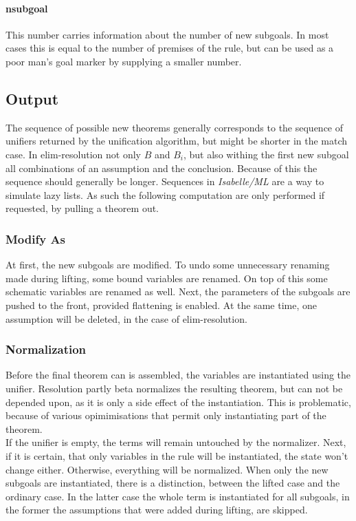 \paragraph{nsubgoal}
This number carries information about the number of new subgoals. In most cases this is equal to the number of premises of the rule, but can be used as a poor man's goal marker by supplying a smaller number.


\subsection{Output}
The sequence of possible new theorems generally corresponds to the sequence of unifiers returned by the unification algorithm, but might be shorter in the match case. In elim-resolution not only $B$ and $B_i$, but also withing the first new subgoal all combinations of an assumption and the conclusion. Because of this the sequence should generally be longer. Sequences in \textit{Isabelle/ML} are a way to simulate lazy lists. As such the following computation are only performed if requested, by pulling a theorem out.

\subsubsection{Modify As}
At first, the new subgoals are modified. To undo some unnecessary renaming made during lifting, some bound variables are renamed. On top of this some schematic variables are renamed as well. Next, the parameters of the subgoals are pushed to the front, provided flattening is enabled. At the same time, one assumption will be deleted, in the case of elim-resolution.

\subsubsection{Normalization}
Before the final theorem can is assembled, the variables are instantiated using the unifier. Resolution partly beta normalizes the resulting theorem, but can not be depended upon, as it is only a side effect of the instantiation. This is problematic, because of various opimimisations that permit only instantiating part of the theorem.\\
If the unifier is empty, the terms will remain untouched by the normalizer. Next, if it is certain, that only variables in the rule will be instantiated, the state won't change either. Otherwise, everything will be normalized. When only the new subgoals are instantiated, there is a distinction, between the lifted case and the ordinary case. In the latter case the whole term is instantiated for all subgoals, in the former the assumptions that were added during lifting, are skipped.

